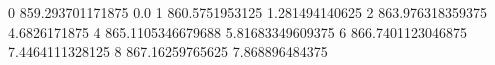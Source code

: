 0 859.293701171875 0.0
1 860.5751953125 1.281494140625
2 863.976318359375 4.6826171875
4 865.1105346679688 5.81683349609375
6 866.7401123046875 7.4464111328125
8 867.16259765625 7.868896484375
